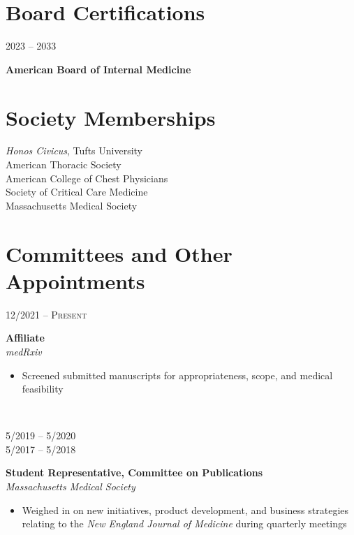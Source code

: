 \documentclass{article}
\newcommand\colleft{.20}
\newcommand\colright{.75}
\newcommand{\entryfour}[4]
	{
		\begin{minipage}[t]{\colleft\textwidth}
		\hfill \textsc{#1}
		\end{minipage}
		\hfill\vline\hfill
		\begin{minipage}[t]{\colright\textwidth}
		{\bf#2}\\
		\textit{#3}
		\footnotesize{#4}
		\end{minipage}\\
		\entryvspace
	}%
\newcommand{\entrytwo}[2]
{
	\begin{minipage}[t]{\colleft\textwidth}
		\hfill \textsc{#1}
	\end{minipage}
	\hfill\vline\hfill
	\begin{minipage}[t]{\colright\textwidth}
		{\bf#2}
	\end{minipage}
	\entryvspace
}%
\newcommand{\entryvspace}{\vspace{0.5em}}
\begin{document}
	\section*{Board Certifications}
		\entrytwo{2023 -- 2033}{American Board of Internal Medicine}
	\section*{Society Memberships}
		\emph{Honos Civicus}, Tufts University\\
		American Thoracic Society\\
		American College of Chest Physicians\\
		Society of Critical Care Medicine\\
		Massachusetts Medical Society
		
	\section*{Committees and Other Appointments}
		\entryfour{12/2021 -- Present}{Affiliate}{medRxiv}{%
			\begin{itemize}
				\item Screened submitted manuscripts for appropriateness, scope, and medical feasibility
		\end{itemize}
		}


\begin{minipage}[t]{\colleft\textwidth}
	\vspace{0.1pc}
	\begin{flushright}
		5/2019 -- 5/2020\\
		5/2017 -- 5/2018
	\end{flushright}
\end{minipage}
\hfill\vline\hfill
\begin{minipage}[t]{\colright\textwidth}
	{\bf Student Representative, Committee on Publications}\\
	\textit{Massachusetts Medical Society}
	\footnotesize{%
		\begin{itemize}
			\item  Weighed in on new initiatives, product development, and business strategies relating to the \emph{New England Journal of Medicine} during quarterly meetings
		\end{itemize}
	}
\end{minipage}
\entryvspace
\end{document}

